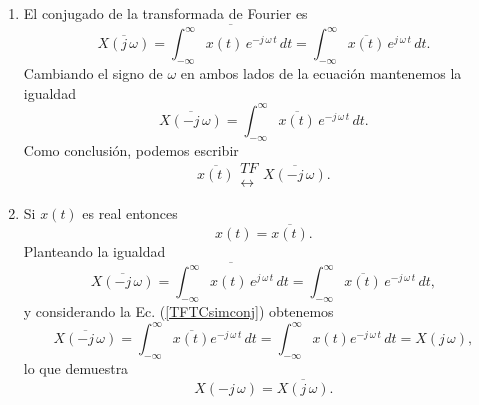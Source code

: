 \begin{enumerate}
\item  El conjugado de la transformada de Fourier es 
\begin{equation}
      \overline{X\left( j \, \omega \right)} =
               \overline{\int_{-\infty }^{\infty }x\left(t\right) \, e^{-j \, \omega \, t} \, dt}=
               \int_{-\infty }^{\infty } \overline{x\left( t\right)} \, e^{j \, \omega \, t} \, dt.
\end{equation}
Cambiando el signo de $\omega$ en ambos lados de la ecuaci\'{o}n mantenemos la igualdad
\begin{equation}
        \overline{X\left( -j \, \omega \right)} =
                \int_{-\infty }^{\infty }\overline{x\left(t\right)} \, e^{-j \, \omega \, t} \, dt.
\end{equation}
Como conclusi\'{o}n, podemos escribir
\begin{equation}
        \overline{x\left( t\right)} 
        \begin{array}{l}
                TF \\ 
                \leftrightarrow
        \end{array}
        \overline{X\left( -j \, \omega \right)} .
\end{equation}

\item  Si $x\left( t\right) $ es real entonces 
\begin{equation}
        x\left( t\right) = \overline{x\left( t\right)}. \label{TFTCsimconj}
\end{equation}
Planteando la igualdad
\begin{equation}
        \overline{X\left( -j \, \omega \right)} =
                \overline{\int_{-\infty }^{\infty }x\left(t\right) \, e^{j \, \omega \, t} \, dt}=
                        \int_{-\infty }^{\infty }\overline{x\left( t\right)} \, e^{-j \, \omega \, t} \, dt,
\end{equation}
y considerando la Ec. (\ref{TFTCsimconj}) obtenemos
\begin{equation}
        \overline{X\left( -j \, \omega \right)} =
                \int_{-\infty }^{\infty }\overline{x\left(t\right)} e^{-j \, \omega \, t} \, dt=
                \int_{-\infty }^{\infty }x\left( t\right)e^{-j \, \omega \, t} \, dt=X\left( j \, \omega \right) ,
\end{equation}
lo que demuestra 
\begin{equation}
        X\left( -j \, \omega \right) = \overline{X\left( j \, \omega \right)} .  \label{conjuuno}
\end{equation}


\end{enumerate}

